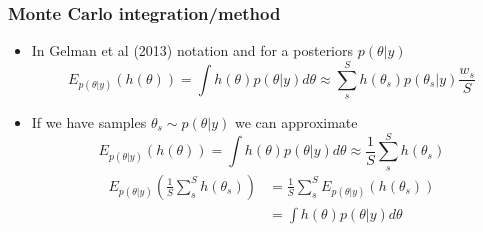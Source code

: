 \documentclass[10pt]{beamer}
\begin{document}
\begin{frame}
\frametitle{Monte Carlo integration/method}

  \begin{itemize}
    \item In Gelman et al (2013) notation and for a posteriors $p(\theta|y)$
    \[
      E_{p(\theta|y)}(h(\theta)) = \int h(\theta) p(\theta|y) d\theta \approx \sum_s^S h(\theta_s) p(\theta_s|y) \frac{w_s}{S}
    \]
    \pause
    \item If we have samples $\theta_s \sim p(\theta|y)$ we can approximate
        \[
      E_{p(\theta|y)}(h(\theta)) = \int h(\theta) p(\theta|y) d\theta \approx \frac{1}{S} \sum_s^S h(\theta_s)
    \]
    \pause
    \begin{align*}
    E_{p(\theta|y)}\left( \frac{1}{S}\sum_s^S h(\theta_s)\right) & = \frac{1}{S} \sum_s^S E_{p(\theta|y)}  \left( h(\theta_s)\right) \\
    & = \int h(\theta) p(\theta|y) d\theta
    \end{align*}
  \end{itemize}


\end{frame}


\end{document}
